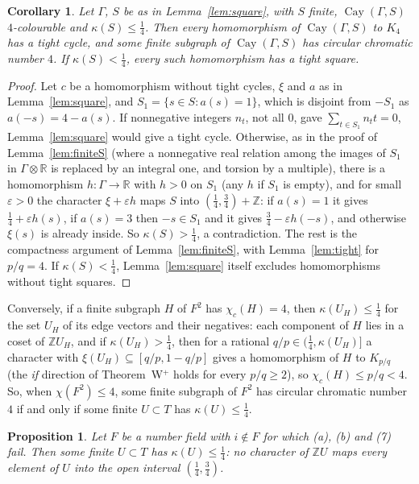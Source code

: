 \documentclass[11pt,a4paper]{amsart}
\newtheorem{corollary}{Corollary}
\newtheorem{proposition}{Proposition}
\theoremstyle{remark}
\newcommand{\R}{\mathbb{R}}
\newcommand{\Z}{\mathbb{Z}}
\newcommand{\Cay}{\operatorname{Cay}}
\begin{document}
\begin{corollary}\label{cor:finiteS4}
Let $\Gamma$, $S$ be as in Lemma~\ref{lem:square}, with $S$ finite, $\Cay(\Gamma,S)$ $4$-colourable and
$\kappa(S)\le\frac14$. Then every homomorphism of $\Cay(\Gamma,S)$ to $K_4$ has a tight cycle, and some finite
subgraph of $\Cay(\Gamma,S)$ has circular chromatic number $4$. If $\kappa(S)<\frac14$, every such homomorphism
has a tight square.
\end{corollary}

\begin{proof}
Let $c$ be a homomorphism without tight cycles, $\xi$ and $a$ as in Lemma~\ref{lem:square}, and
$S_1=\{s\in S:a(s)=1\}$, which is disjoint from $-S_1$ as $a(-s)=4-a(s)$. If nonnegative integers $n_t$, not all
$0$, gave $\sum_{t\in S_1}n_tt=0$, Lemma~\ref{lem:square} would give a tight cycle. Otherwise, as in the proof of
Lemma~\ref{lem:finiteS} (where a nonnegative real relation among the images of $S_1$ in $\Gamma\otimes\R$ is
replaced by an integral one, and torsion by a multiple), there is a homomorphism $h\colon\Gamma\to\R$ with $h>0$ on
$S_1$ (any $h$ if $S_1$ is empty), and for small $\varepsilon>0$ the character $\xi+\varepsilon h$ maps $S$ into
$(\frac14,\frac34)+\Z$: if $a(s)=1$ it gives $\frac14+\varepsilon h(s)$, if $a(s)=3$ then $-s\in S_1$ and it gives
$\frac34-\varepsilon h(-s)$, and otherwise $\xi(s)$ is already inside. So $\kappa(S)>\frac14$, a contradiction. The
rest is the compactness argument of Lemma~\ref{lem:finiteS}, with Lemma~\ref{lem:tight} for $p/q=4$. If
$\kappa(S)<\frac14$, Lemma~\ref{lem:square} itself excludes homomorphisms without tight squares.
\end{proof}

Conversely, if a finite subgraph $H$ of $F^2$ has $\chi_c(H)=4$, then $\kappa(U_H)\le\frac14$ for the set $U_H$ of its
edge vectors and their negatives: each component of $H$ lies in a coset of $\Z U_H$, and if $\kappa(U_H)>\frac14$,
then for a rational $q/p\in(\frac14,\kappa(U_H)]$ a character with $\xi(U_H)\subseteq[q/p,1-q/p]$ gives a
homomorphism of $H$ to $K_{p/q}$ (the \emph{if} direction of Theorem~W$^+$ holds for every $p/q\ge2$), so
$\chi_c(H)\le p/q<4$. So, when $\chi(F^2)\le4$, some finite subgraph of $F^2$ has circular chromatic number $4$ if and
only if some finite $U\subset T$ has $\kappa(U)\le\frac14$.

\begin{proposition}\label{prop:quarter}
Let $F$ be a number field with $i\notin F$ for which \textup{(a)}, \textup{(b)} and \textup{(7)} fail. Then some
finite $U\subset T$ has $\kappa(U)\le\frac14$: no character of $\Z U$ maps every element of $U$ into the open
interval $(\frac14,\frac34)$.
\end{proposition}
\end{document}
